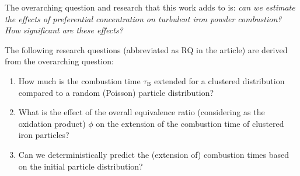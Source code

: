 \documentclass[times,twocolumn,final]{elsarticle}
\newcommand{\mrm}[1]{\mathrm{#1}}
\newcommand{\St}{\mathrm{St}}
\newcommand{\Rel}{\mathrm{Re}_\lambda}
\begin{document}
The overarching question and research that this work adds to is: \textit{can we estimate the effects of preferential concentration on turbulent iron powder combustion? How significant are these effects?}

The following research questions (abbreviated as RQ in the article) are derived from the overarching question:
\begin{enumerate}[label=RQ:\Roman*,leftmargin=1.1cm]
\itemsep0em

    \item  How much is the combustion time $\tau_\mrm{B}$ extended for a clustered distribution compared to a random (Poisson) particle distribution? \label{item:rq2}
    \item What is the effect of the overall equivalence ratio (considering  as the oxidation product) $\phi$ on the extension of the combustion time of clustered iron particles? \label{item:rq3}
    \item Can we deterministically predict the (extension of) combustion times based on the initial particle distribution? \label{item:rq4}
\end{enumerate}
\end{document}
